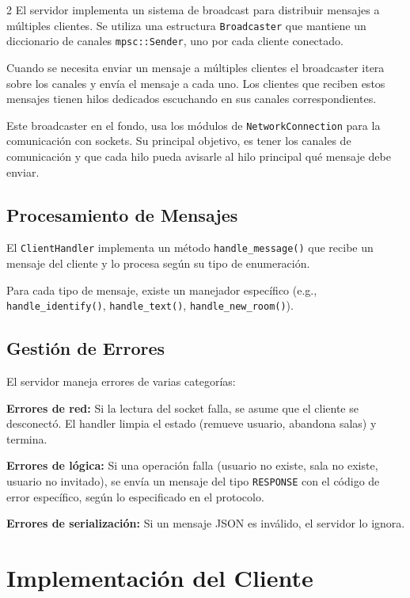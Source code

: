 \documentclass[letter,11pt]{article}
\begin{document}
\begin{multicols}{2}
El servidor implementa un sistema de broadcast para distribuir mensajes a múltiples clientes. Se utiliza una estructura \texttt{Broadcaster} que mantiene un diccionario de canales \texttt{mpsc::Sender}, uno por cada cliente conectado.

Cuando se necesita enviar un mensaje a múltiples clientes el broadcaster itera sobre los canales y envía el mensaje a cada uno. Los clientes que reciben estos mensajes tienen hilos dedicados escuchando en sus canales correspondientes.

Este broadcaster en el fondo, usa los módulos de \texttt{NetworkConnection} para la comunicación con sockets.
Su principal objetivo, es tener los canales de comunicación y que cada hilo pueda avisarle al hilo principal qué mensaje debe enviar.

\subsection{Procesamiento de Mensajes}

El \texttt{ClientHandler} implementa un método \texttt{handle\_message()} que recibe un mensaje del cliente y lo procesa según su tipo de enumeración.

Para cada tipo de mensaje, existe un manejador específico (e.g., \texttt{handle\_identify()}, \texttt{handle\_text()}, \texttt{handle\_new\_room()}).

\subsection{Gestión de Errores}

El servidor maneja errores de varias categorías:

\textbf{Errores de red:} Si la lectura del socket falla, se asume que el cliente se desconectó. El handler limpia el estado (remueve usuario, abandona salas) y termina.

\textbf{Errores de lógica:} Si una operación falla (usuario no existe, sala no existe, usuario no invitado), se envía un mensaje del tipo \texttt{RESPONSE} con el código de error específico, según lo especificado en el protocolo.

\textbf{Errores de serialización:} Si un mensaje JSON es inválido, el servidor lo ignora.


\section{Implementación del Cliente}


\end{multicols}
\end{document}

